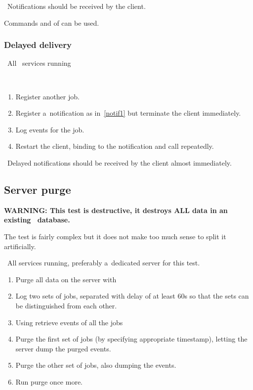 \result\ Notifications should be received by the client.

\begin{hints}
Commands  and  of 
can be used.
\end{hints}




\subsubsection{Delayed delivery}

\req\ All \LB\ services running

\how\
\begin{enumerate}
\item Register another job.
\item Register a~notification as in~\ref{notif1} but terminate the client
immediately.
\item Log events for the job.
\item Restart the client, binding to the notification and call
 repeatedly.
\end{enumerate}

\result\ Delayed notifications should be received by the client almost
immediately.




\subsection{Server purge}

\textbf{WARNING: This test is destructive, it destroys ALL data in an
existing \LB\ database.}

The test is fairly complex but it does not make too much sense to split it
artificially.

\req\ All \LB services running, preferably a~dedicated server for this test.

\how
\begin{enumerate}
\item Purge all data on the server with 
\item Log two sets of jobs, separated with delay of at least 60s so
that the sets can be distinguished from each other.
\item \label{purgel}
Using  retrieve events of all the jobs
\item \label{purge1}
Purge the first set of jobs (by specifying appropriate timestamp),
letting the server dump the purged events.
\item \label{purge2} Purge the other set of jobs, also dumping the events.
\item \label{purge3} Run purge once more.
\end{enumerate}

